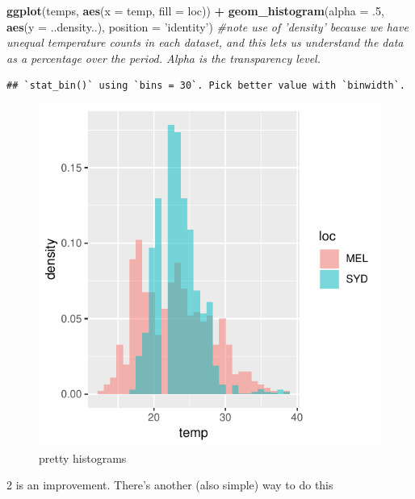 \documentclass[]{article}
\newenvironment{Shaded}{\begin{snugshade}}{\end{snugshade}}
\newcommand{\CommentTok}[1]{\textcolor[rgb]{0.56,0.35,0.01}{\textit{#1}}}
\newcommand{\DataTypeTok}[1]{\textcolor[rgb]{0.13,0.29,0.53}{#1}}
\newcommand{\FloatTok}[1]{\textcolor[rgb]{0.00,0.00,0.81}{#1}}
\newcommand{\KeywordTok}[1]{\textcolor[rgb]{0.13,0.29,0.53}{\textbf{#1}}}
\newcommand{\NormalTok}[1]{#1}
\newcommand{\OperatorTok}[1]{\textcolor[rgb]{0.81,0.36,0.00}{\textbf{#1}}}
\newcommand{\StringTok}[1]{\textcolor[rgb]{0.31,0.60,0.02}{#1}}
\begin{document}
\begin{Shaded}
\begin{Highlighting}[]
\KeywordTok{ggplot}\NormalTok{(temps, }\KeywordTok{aes}\NormalTok{(}\DataTypeTok{x =}\NormalTok{ temp, }\DataTypeTok{fill =}\NormalTok{ loc)) }\OperatorTok{+}\StringTok{ }\KeywordTok{geom_histogram}\NormalTok{(}\DataTypeTok{alpha =} \FloatTok{.5}\NormalTok{, }\KeywordTok{aes}\NormalTok{(}\DataTypeTok{y =}\NormalTok{ ..density..), }\DataTypeTok{position =} \StringTok{'identity'}\NormalTok{) }\CommentTok{#note use of 'density' because we have unequal temperature counts in each dataset, and this lets us understand the data as a percentage over the period. Alpha is the transparency level.}
\end{Highlighting}
\end{Shaded}

\begin{verbatim}
## `stat_bin()` using `bins = 30`. Pick better value with `binwidth`.
\end{verbatim}

\begin{figure}
\centering
\includegraphics{AT2_template__medium__files/figure-latex/pretty histograms density-1.pdf}
\caption{pretty histograms}
\end{figure}

2 is an improvement. There's another (also simple) way to do this
\end{document}
